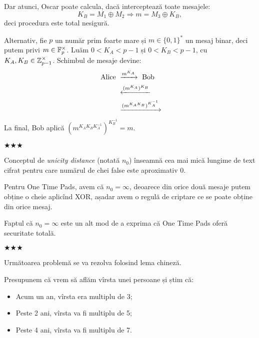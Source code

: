 Dar atunci, Oscar poate calcula, dacă interceptează toate mesajele:
\[
  K_B = M_1 \oplus M_2 \Rightarrow m = M_3 \oplus K_B,
\]
deci procedura este total nesigură.

Alternativ, fie $ p $ un număr prim foarte mare și $ m \in \{ 0, 1 \}^\ast $
un mesaj binar, deci putem privi $ m \in \mathbb{F}_p^\times $. Luăm $ 0 < K_A < p - 1 $
și $ 0 < K_B < p - 1 $, cu $ K_A, K_B \in \mathbb{Z}_{p-1}^\times $. Schimbul de mesaje devine:
\begin{align*}
  \text{ Alice } &\xrightarrow{m^{K_A}} \text{ Bob } \\
                 &\xleftarrow{(m^{K_A})^{K_B}} \\
                 &\xrightarrow{(m^{K_AK_B})^{K_A^{-1}}} \\
\end{align*}
La final, Bob aplică $ (m^{K_AK_BK_A^{-1}})^{K_B^{-1}} = m $.

\begin{center}
  {\large $\bigstar\bigstar\bigstar$}
\end{center}

Conceptul de \emph{unicity distance} (notată $ n_0 $)
 înseamnă
cea mai mică lungime de text cifrat pentru care numărul de chei false
este aproximativ 0.

Pentru One Time Pads, avem că $ n_0 = \infty $, deoarece din orice două mesaje
putem obține o cheie aplicînd XOR, așadar avem o regulă de criptare ce se poate
obține din orice mesaj.

Faptul că $ n_0 = \infty $ este un alt mod de a exprima că One Time Pads oferă
securitate totală.

\begin{center}
  {\large $\bigstar\bigstar\bigstar$}
\end{center}

Următoarea problemă se va rezolva folosind lema chineză.

Presupunem că vrem să aflăm vîrsta unei persoane și știm că:
\begin{itemize}
\item Acum un an, vîrsta era multiplu de 3;
\item Peste 2 ani, vîrsta va fi multiplu de 5;
\item Peste 4 ani, vîrsta va fi multiplu de 7.
\end{itemize}

